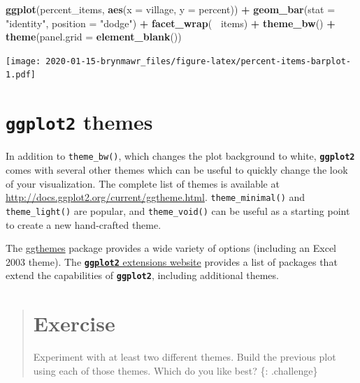\documentclass[]{book}
\newenvironment{Shaded}{\begin{snugshade}}{\end{snugshade}}
\newcommand{\KeywordTok}[1]{\textcolor[rgb]{0.13,0.29,0.53}{\textbf{#1}}}
\newcommand{\DataTypeTok}[1]{\textcolor[rgb]{0.13,0.29,0.53}{#1}}
\newcommand{\StringTok}[1]{\textcolor[rgb]{0.31,0.60,0.02}{#1}}
\newcommand{\OperatorTok}[1]{\textcolor[rgb]{0.81,0.36,0.00}{\textbf{#1}}}
\newcommand{\NormalTok}[1]{#1}
\begin{document}
\begin{Shaded}
\begin{Highlighting}[]
\KeywordTok{ggplot}\NormalTok{(percent_items, }\KeywordTok{aes}\NormalTok{(}\DataTypeTok{x =}\NormalTok{ village, }\DataTypeTok{y =}\NormalTok{ percent)) }\OperatorTok{+}
\StringTok{    }\KeywordTok{geom_bar}\NormalTok{(}\DataTypeTok{stat =} \StringTok{"identity"}\NormalTok{, }\DataTypeTok{position =} \StringTok{"dodge"}\NormalTok{) }\OperatorTok{+}
\StringTok{    }\KeywordTok{facet_wrap}\NormalTok{(}\OperatorTok{~}\StringTok{ }\NormalTok{items) }\OperatorTok{+}
\StringTok{    }\KeywordTok{theme_bw}\NormalTok{() }\OperatorTok{+}
\StringTok{    }\KeywordTok{theme}\NormalTok{(}\DataTypeTok{panel.grid =} \KeywordTok{element_blank}\NormalTok{())}
\end{Highlighting}
\end{Shaded}

\texttt{[image: 2020-01-15-brynmawr\_files/figure-latex/percent-items-barplot-1.pdf]}

\section{\texorpdfstring{\textbf{\texttt{ggplot2}}
themes}{ggplot2 themes}}\label{ggplot2-themes}

In addition to \texttt{theme\_bw()}, which changes the plot background
to white, \textbf{\texttt{ggplot2}} comes with several other themes
which can be useful to quickly change the look of your visualization.
The complete list of themes is available at
\url{http://docs.ggplot2.org/current/ggtheme.html}.
\texttt{theme\_minimal()} and \texttt{theme\_light()} are popular, and
\texttt{theme\_void()} can be useful as a starting point to create a new
hand-crafted theme.

The
\href{https://jrnold.github.io/ggthemes/reference/index.html}{ggthemes}
package provides a wide variety of options (including an Excel 2003
theme). The
\href{https://www.ggplot2-exts.org}{\textbf{\texttt{ggplot2}} extensions
website} provides a list of packages that extend the capabilities of
\textbf{\texttt{ggplot2}}, including additional themes.

\begin{quote}
\section{Exercise}\label{exercise-14}

Experiment with at least two different themes. Build the previous plot
using each of those themes. Which do you like best? \{: .challenge\}
\end{quote}
\end{document}
